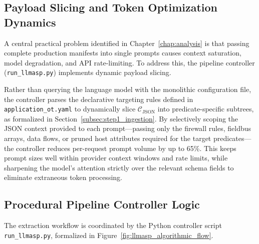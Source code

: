 \documentclass[target=mst,aauheader=aics,style=]{thud}
\begin{document}
\subsection{Payload Slicing and Token Optimization Dynamics}
A central practical problem identified in Chapter~\ref{chap:analysis} is that passing complete production manifests into single prompts causes context saturation, model degradation, and API rate-limiting. To address this, the pipeline controller (\texttt{run\_llmasp.py}) implements dynamic payload slicing.

Rather than querying the language model with the monolithic configuration file, the controller parses the declarative targeting rules defined in \texttt{application\_ot.yaml} to dynamically slice $\mathcal{C}_{\text{JSON}}$ into predicate-specific subtrees, as formalized in Section~\ref{subsec:step1_ingestion}. By selectively scoping the JSON context provided to each prompt—passing only the firewall rules, fieldbus arrays, data flows, or pruned host attributes required for the target predicates—the controller reduces per-request prompt volume by up to 65\%. This keeps prompt sizes well within provider context windows and rate limits, while sharpening the model's attention strictly over the relevant schema fields to eliminate extraneous token processing.

\subsection{Procedural Pipeline Controller Logic}
The extraction workflow is coordinated by the Python controller script \texttt{run\_llmasp.py}, formalized in Figure~\ref{fig:llmasp_algorithmic_flow}.
\end{document}
